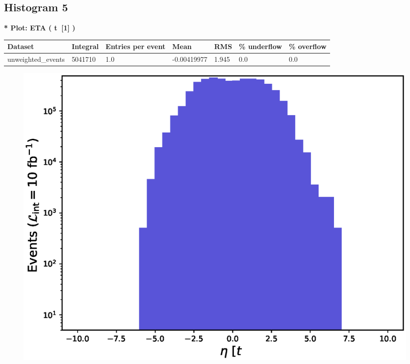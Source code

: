 \documentclass[a4paper, 10pt]{article}
\begin{document}
\subsection{ Histogram 5}

\textbf{* Plot: ETA ( t~[1] ) }\\
   \begin{table}[H]
  \begin{center}
    \begin{tabular}{|m{23.0mm}|m{23.0mm}|m{18.0mm}|m{19.0mm}|m{19.0mm}|m{19.0mm}|m{19.0mm}|}
      \hline
      {\cellcolor{yellow}         Dataset}& {\cellcolor{yellow}         Integral}& {\cellcolor{yellow}         Entries per event}& {\cellcolor{yellow}         Mean}& {\cellcolor{yellow}         RMS}& {\cellcolor{yellow}         \% underflow}& {\cellcolor{yellow}         \% overflow}\\
      \hline
      {\cellcolor{white}         unweighted\_events}& {\cellcolor{white}         5041710}& {\cellcolor{white}         1.0}& {\cellcolor{white}         -0.00419977}& {\cellcolor{white}         1.945}& {\cellcolor{green}         0.0}& {\cellcolor{green}         0.0}\\
\hline
    \end{tabular}
  \end{center}
\end{table}

\begin{figure}[H]
  \begin{center}
    \includegraphics[scale=0.45]{selection_4.eps}\\
\caption{   }
  \end{center}
\end{figure}
      \newpage
\end{document}
